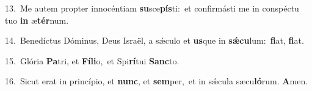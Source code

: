 {\numbfont\textcolor{\numbcolor}{13.}}~Me autem propter innocéntiam \textbf{su}\-sce\-\textbf{pís}\-ti:~\star et confirmásti me in conspéctu tuo \textbf{in} æ\-\textbf{tér}\-num.\par
{\numbfont\textcolor{\numbcolor}{14.}}~Benedíctus Dóminus, Deus Israël, a sǽculo et \textbf{us}\-que in \textbf{sǽ}\-\textbf{cu}lum:~\star \textbf{fi}\-at, \textbf{fi}\-at.\par
{\numbfont\textcolor{\numbcolor}{15.}}~Glória \textbf{Pa}\-tri, et \textbf{Fí}\-\textbf{li}o,~\star et Spi\-\textbf{rí}\-tui \textbf{Sanc}\-to.\par
{\numbfont\textcolor{\numbcolor}{16.}}~Sicut erat in princípio, et \textbf{nunc}\-, et \textbf{sem}\-per,~\star et in sǽcula sæcu\-\textbf{ló}\-rum. \textbf{A}\-men.\par
